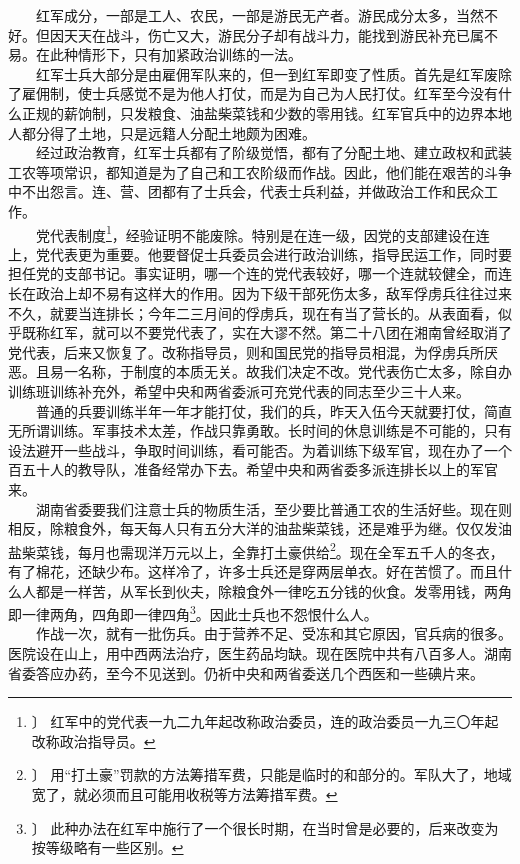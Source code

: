 \documentclass[cn,11pt,chinese]{elegantbook}
\begin{document}
　　红军成分，一部是工人、农民，一部是游民无产者。游民成分太多，当然不好。但因天天在战斗，伤亡又大，游民分子却有战斗力，能找到游民补充已属不易。在此种情形下，只有加紧政治训练的一法。\\
　　红军士兵大部分是由雇佣军队来的，但一到红军即变了性质。首先是红军废除了雇佣制，使士兵感觉不是为他人打仗，而是为自己为人民打仗。红军至今没有什么正规的薪饷制，只发粮食、油盐柴菜钱和少数的零用钱。红军官兵中的边界本地人都分得了土地，只是远籍人分配土地颇为困难。\\
　　经过政治教育，红军士兵都有了阶级觉悟，都有了分配土地、建立政权和武装工农等项常识，都知道是为了自己和工农阶级而作战。因此，他们能在艰苦的斗争中不出怨言。连、营、团都有了士兵会，代表士兵利益，并做政治工作和民众工作。\\
　　党代表制度\footnote[14]{〕 红军中的党代表一九二九年起改称政治委员，连的政治委员一九三〇年起改称政治指导员。}，经验证明不能废除。特别是在连一级，因党的支部建设在连上，党代表更为重要。他要督促士兵委员会进行政治训练，指导民运工作，同时要担任党的支部书记。事实证明，哪一个连的党代表较好，哪一个连就较健全，而连长在政治上却不易有这样大的作用。因为下级干部死伤太多，敌军俘虏兵往往过来不久，就要当连排长；今年二三月间的俘虏兵，现在有当了营长的。从表面看，似乎既称红军，就可以不要党代表了，实在大谬不然。第二十八团在湘南曾经取消了党代表，后来又恢复了。改称指导员，则和国民党的指导员相混，为俘虏兵所厌恶。且易一名称，于制度的本质无关。故我们决定不改。党代表伤亡太多，除自办训练班训练补充外，希望中央和两省委派可充党代表的同志至少三十人来。\\
　　普通的兵要训练半年一年才能打仗，我们的兵，昨天入伍今天就要打仗，简直无所谓训练。军事技术太差，作战只靠勇敢。长时间的休息训练是不可能的，只有设法避开一些战斗，争取时间训练，看可能否。为着训练下级军官，现在办了一个百五十人的教导队，准备经常办下去。希望中央和两省委多派连排长以上的军官来。\\
　　湖南省委要我们注意士兵的物质生活，至少要比普通工农的生活好些。现在则相反，除粮食外，每天每人只有五分大洋的油盐柴菜钱，还是难乎为继。仅仅发油盐柴菜钱，每月也需现洋万元以上，全靠打土豪供给\footnote[15]{〕 用“打土豪”罚款的方法筹措军费，只能是临时的和部分的。军队大了，地域宽了，就必须而且可能用收税等方法筹措军费。}。现在全军五千人的冬衣，有了棉花，还缺少布。这样冷了，许多士兵还是穿两层单衣。好在苦惯了。而且什么人都是一样苦，从军长到伙夫，除粮食外一律吃五分钱的伙食。发零用钱，两角即一律两角，四角即一律四角\footnote[16]{〕 此种办法在红军中施行了一个很长时期，在当时曾是必要的，后来改变为按等级略有一些区别。}。因此士兵也不怨恨什么人。\\
　　作战一次，就有一批伤兵。由于营养不足、受冻和其它原因，官兵病的很多。医院设在山上，用中西两法治疗，医生药品均缺。现在医院中共有八百多人。湖南省委答应办药，至今不见送到。仍祈中央和两省委送几个西医和一些碘片来。\\
\end{document}
